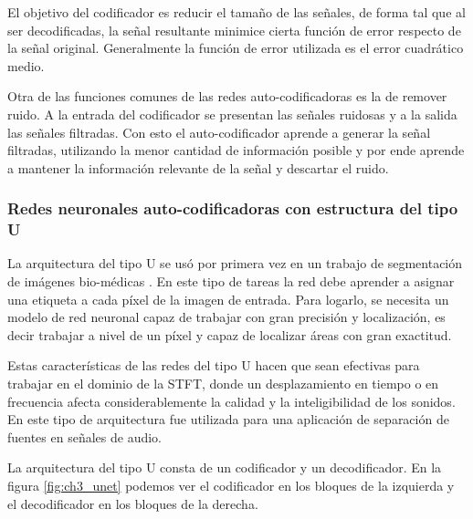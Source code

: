 El objetivo del codificador es reducir el tamaño de las señales, de forma tal que al ser decodificadas, la señal resultante minimice cierta función de error respecto de la señal original. Generalmente la función de error utilizada es el error cuadrático medio.

Otra de las funciones comunes de las redes auto-codificadoras es la de remover ruido. A la entrada del codificador se presentan las señales ruidosas y a la salida las señales filtradas. Con esto el auto-codificador aprende a generar la señal filtradas, utilizando la menor cantidad de información posible y por ende aprende a mantener la información relevante de la señal y descartar el ruido.

\subsubsection{Redes neuronales auto-codificadoras con estructura del tipo U}
\label{sec:redes_tipo_u}

La arquitectura del tipo U se usó por primera vez en un trabajo de segmentación de imágenes bio-médicas \cite{U_Net_Convolutional_Networks_for_Biomedical_Image_Segmentation}. En este tipo de tareas la red debe aprender a asignar una etiqueta a cada píxel de la imagen de entrada. Para logarlo, se necesita un modelo de red neuronal capaz de trabajar con gran precisión y localización, es decir trabajar a nivel de un píxel y capaz de localizar áreas con gran exactitud.

Estas características de las redes del tipo U hacen que sean efectivas para trabajar en el dominio de la STFT, donde un desplazamiento en tiempo o en frecuencia afecta considerablemente la calidad y la inteligibilidad de los sonidos. En \cite{singing_voice_separation_with_deep_u_net_convolutional_networks} este tipo de arquitectura fue utilizada para una aplicación de separación de fuentes en señales de audio.

La arquitectura del tipo U consta de un codificador y un decodificador. En la figura \ref{fig:ch3_unet} podemos ver el codificador en los bloques de la izquierda y el decodificador en los bloques de la derecha.

